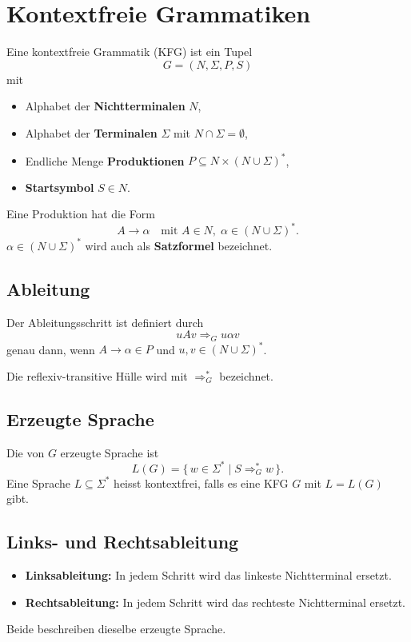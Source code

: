 \section{Kontextfreie Grammatiken}

Eine kontextfreie Grammatik (KFG) ist ein Tupel
\[
	G = (N, \Sigma, P, S)
\]
mit
\begin{itemize}
	\item Alphabet der \textbf{Nichtterminalen} $N$,
	\item Alphabet der \textbf{Terminalen} $\Sigma$ mit $N \cap \Sigma = \emptyset$,
	\item Endliche Menge \textbf{Produktionen} $P \subseteq N \times (N \cup \Sigma)^*$,
	\item \textbf{Startsymbol} $S \in N$.
\end{itemize}

Eine Produktion hat die Form
\[
	A \to \alpha \quad \text{mit } A \in N,\; \alpha \in (N \cup \Sigma)^*.
\]
\(\alpha \in (N \cup \Sigma)^*\) wird auch als \textbf{Satzformel} bezeichnet.

\subsection{Ableitung}
Der Ableitungsschritt ist definiert durch
\[
	uAv \Rightarrow_G u\alpha v
\]
genau dann, wenn $A \to \alpha \in P$ und $u,v \in (N \cup \Sigma)^*$.

Die reflexiv-transitive Hülle wird mit $\Rightarrow_G^*$ bezeichnet.

\subsection{Erzeugte Sprache}
Die von $G$ erzeugte Sprache ist
\[
	L(G) = \{\,w \in \Sigma^* \mid S \Rightarrow_G^* w\,\}.
\]
Eine Sprache $L \subseteq \Sigma^*$ heisst kontextfrei, falls es eine KFG $G$ mit $L=L(G)$ gibt.

\subsection{Links- und Rechtsableitung}
\begin{itemize}
	\item \textbf{Linksableitung:} In jedem Schritt wird das linkeste Nichtterminal ersetzt.
	\item \textbf{Rechtsableitung:} In jedem Schritt wird das rechteste Nichtterminal ersetzt.
\end{itemize}
Beide beschreiben dieselbe erzeugte Sprache.

